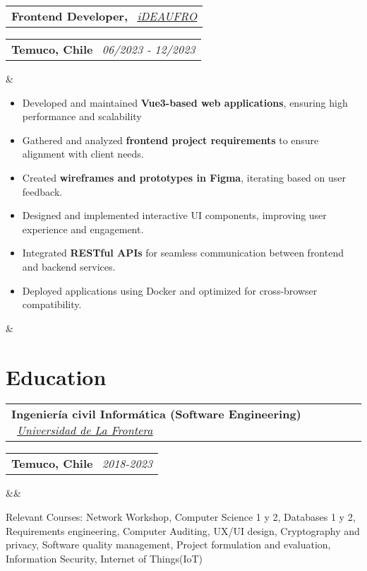 \documentclass[11pt,a4paper,sans]{moderncv}
\makeatletter
\newcommand{\sectionMargin}{-3mm}
\newcommand*{\customcventry}[7][.13em]{
    \begin{tabular}{@{}l}
    {\bfseries #4} \
    {\itshape #3}
    \end{tabular}
    \hfill
    \begin{tabular}{l@{}}
    {\bfseries #5} \
    {\itshape #2}
    \end{tabular}
    \ifx&#7&%
    \else{\
    \begin{minipage}{\maincolumnwidth}%
    \small#7%
    \end{minipage}}\fi%
    \par\addvspace{#1}
}
\makeatother
\begin{document}
{  \customcventry
  {06/2023 ‐ 12/2023}
  {\href{https://ideaufro.com/}{\underline{iDEAUFRO}}}
  {Frontend Developer,}
  {Temuco, Chile}{}
  {{\begin{itemize}[leftmargin=0.6cm, noitemsep, label={\textbullet}]
    \item Developed and maintained \textbf{Vue3-based web applications}, ensuring high performance and scalability
    \item Gathered and analyzed \textbf{frontend project requirements} to ensure alignment with client needs.
    \item Created \textbf{wireframes and prototypes in Figma}, iterating based on user feedback.
    \item Designed and implemented interactive UI components, improving user experience and engagement.
    \item Integrated \textbf{RESTful APIs} for seamless communication between frontend and backend services.
    \item Deployed applications using Docker and optimized for cross-browser compatibility.
  \end{itemize}}
  }
}

\vspace*{\sectionMargin}

\section{Education}
\customcventry
    {2018-2023}
    {\href{https://1drv.ms/b/c/13c8ae619d64655e/EV5lZJ1hrsgggBOHLAAAAAABHh9OZUbWLd2nx7PTa_OSsg?e=Fedmge}{\underline{Universidad de La Frontera}} }
    {Ingeniería civil Informática (Software Engineering)}
    {Temuco, Chile}
    {}{}
    {Relevant Courses: 
        Network Workshop, 
        Computer Science 1 y 2, 
        Databases 1 y 2, 
        Requirements engineering,
        Computer Auditing,
        UX/UI design,
        Cryptography and privacy,
        Software quality management,
        Project formulation and evaluation,
        Information Security,
        Internet of Things(IoT)
}

\vspace*{\sectionMargin}
\end{document}
